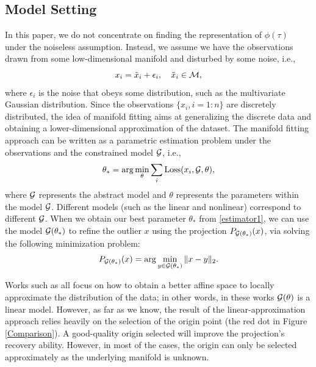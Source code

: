 \documentclass{article}
\theoremstyle{remark}
\begin{document}

\subsection{Model Setting}
In this paper, we do not  concentrate on finding the representation of $\phi(\tau)$ under the noiseless assumption. Instead, we assume we have the observations drawn from some low-dimensional manifold and disturbed by some noise, i.e., 
\[
x_i = \tilde{x}_i+\epsilon_i, \quad \tilde{x}_i \in \cal M,
\]
where $\epsilon_i$ is the noise that obeys some distribution, such as the multivariate Gaussian distribution.
Since the observations $\{x_i, i=1:n\}$ are discretely distributed, the idea of manifold fitting aims at generalizing the discrete data and obtaining a lower-dimensional approximation of the dataset. The manifold fitting approach can be written as a parametric estimation problem under the observations and the constrained model $\cal G$, i.e.,
\begin{equation}\label{estimator1}
 \theta_* =\arg \min_\theta  \sum_i {\rm Loss}(x_i, {\cal G}, \theta ),
\end{equation}
where $\cal G$ represents the abstract model and $\theta$ represents the parameters within the model $\cal G$. Different models (such as the linear and nonlinear) correspond to different $\cal G$. When we obtain our best parameter $\theta_*$ from \eqref{estimator1}, we can use the model ${\cal G}(\theta_*)$ to refine the outlier $x$ using the projection $P_{{\cal G}(\theta_*) }(x)$, via solving the following minimization problem:
\[
P_{{\cal G}(\theta_*) }(x) = \arg \min_{y\in {\cal G}(\theta_*) } \|x-y\|_2.
\]
 
Works such as \cite{genovese2014nonparametric,ozertem2011locally} all focus on how to obtain a better affine space to locally approximate the distribution of the data; in other words, in these works ${\cal G}(\theta)$ is a linear model. However, as far as we know, the result of the linear-approximation approach relies heavily on the selection of the origin point (the red dot in Figure \ref{Comparison}). A good-quality origin selected will improve the projection's recovery ability. However, in most of the cases, the origin can only be selected approximately as the underlying manifold is unknown.
\end{document}
